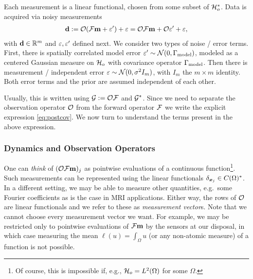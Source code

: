 \documentclass{amsart}
\numberwithin{equation}{section}
\begin{document}

Each measurement is a linear functional, chosen from some subset of
$\mathcal{H}_o^{*}$. Data is acquired via noisy measurements
\begin{align*}
  \mathbf{d} := \mathcal{O} (\mathcal{F} \mathbf{m} + \varepsilon') + \varepsilon = \mathcal{O} \mathcal{F} \mathbf{m} + \mathcal{O} \varepsilon' + \varepsilon,
\end{align*}
with $\mathbf{d} \in \mathbb{R}^m$ and $\varepsilon, \varepsilon'$ defined next. We consider two
types of noise / error terms. First, there is spatially correlated
model error $\varepsilon' \sim \mathcal{N}(0,\Gamma_{\textup{model}})$, modeled as a centered
Gaussian measure on $\mathcal{H}_o$ with covariance operator $\Gamma_{\textup{model}}$. Then
there is measurement / independent error $\varepsilon \sim \mathcal{N}(0,
\sigma^2 I_m)$, with $I_m$ the $m \times m$ identity. Both error terms
and the prior are assumed independent of each other.

Usually, this is written using $\mathcal{G} := \mathcal{O} \mathcal{F}$ and $\mathcal{G}^*$. Since
we need to separate the observation operator $\mathcal{O}$ from the forward
operator $\mathcal{F}$ we write the explicit expression
\eqref{eq:postcov}. We now turn to understand the terms present in the
above expression.



\subsubsection{Dynamics and Observation Operators}\label{subsec:dynamics}
One can \textit{think} of $(\mathcal{O} \mathcal{F} \mathbf{m})_j$ as pointwise
evaluations of a continuous function\footnote{Of course, this is
  impossible if, e.g., $\mathcal{H}_o = L^2(\Omega)$ for some $\Omega$.}. Such
measurements can be represented using the linear functionals
$\delta_{{\boldsymbol{x}}_j} \in C(\Omega)^*$. In a different setting, we may be
able to measure other quantities, e.g.\ some Fourier coefficients as
is the case in MRI applications. Either way, the rows of $\mathcal{O}$ are
linear functionals and we refer to these as {\it measurement
  vector}s. Note that we cannot choose every measurement vector we
want. For example, we may be restricted only to pointwise evaluations
of $\mathcal{F} \mathbf{m}$ by the sensors at our disposal, in which case
measuring the mean $\ell(u) = \int_{\Omega}u$ (or any non-atomic
measure) of a function is not possible.
\end{document}
